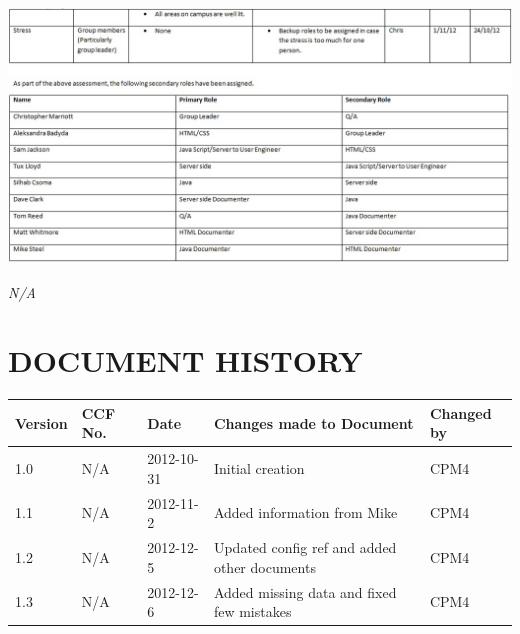 \documentclass{project}
\begin{document}
\includegraphics[scale=0.6]{risk4.jpg}\\
\clearpage
{}
\begin{thebibliography}{5}
\bibitem{} \emph{N/A}
\end{thebibliography}
\clearpage
{}
\section*{DOCUMENT HISTORY}
\begin{tabular}{|l | l | l | l | l |}
\hline
Version & CCF No. & Date & Changes made to Document & Changed by \\
\hline
1.0 & N/A & 2012-10-31 & Initial creation & CPM4 \\
\hline
1.1 & N/A & 2012-11-2 & Added information from Mike & CPM4 \\
\hline
1.2 & N/A & 2012-12-5 & Updated config ref and added other documents & CPM4 \\
\hline
1.3 & N/A & 2012-12-6 & Added missing data and fixed few mistakes & CPM4 \\
\hline
\end{tabular}
\label{thelastpage}
\end{document}
